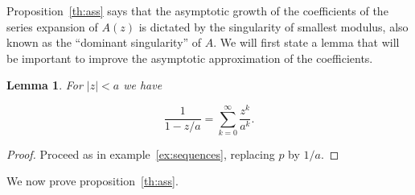\documentclass{article}
\newtheorem{lemma}{Lemma}
\begin{document}
Proposition~\ref{th:ass} says that the asymptotic growth of the
coefficients of the series expansion of $A(z)$ is dictated by the
singularity of smallest modulus, also known as the ``dominant
singularity'' of $A$. We will first state a lemma that will be
important to improve the asymptotic approximation of the coefficients.

\begin{lemma}
\label{lemma:poles}
For $|z| < a$ we have

\begin{equation}
\label{eq:poles}
\frac{1}{1-z/a} = \sum_{k=0}^\infty \frac{z^k}{a^k}.
\end{equation}
\end{lemma}

\begin{proof}
Proceed as in example~\ref{ex:sequences}, replacing $p$ by $1/a$.
\end{proof}

We now prove proposition~\ref{th:ass}.
\end{document}
